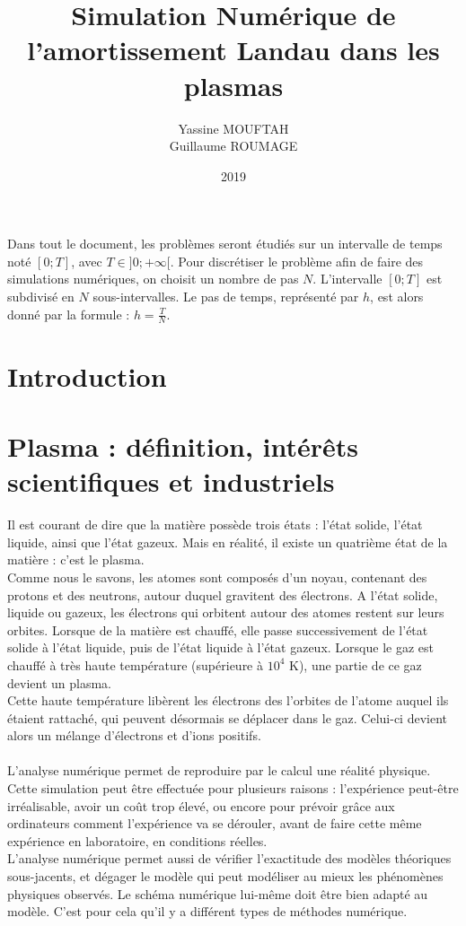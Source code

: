 \documentclass{article}
\title{Simulation Numérique de l'amortissement Landau dans les plasmas}
\date{2019}
\author{Yassine MOUFTAH\\Guillaume ROUMAGE}
\begin{document}
\maketitle
\newpage
\noindent Dans tout le document, les problèmes seront étudiés sur un intervalle de temps noté $[0;T]$, avec $T \in ]0; + \infty[$. Pour discrétiser le problème afin de faire des simulations numériques, on choisit un nombre de pas $N$. L'intervalle $[0;T]$ est subdivisé en $N$ sous-intervalles. Le pas de temps, représenté par $h$, est alors donné par la formule : $h = \frac{T}{N}$.
\newpage
\section{Introduction}
\section{Plasma : définition, intérêts scientifiques et industriels}
Il est courant de dire que la matière possède trois états : l'état solide, l'état liquide, ainsi que l'état gazeux. Mais en réalité, il existe un quatrième état de la matière : c'est le plasma.\\
Comme nous le savons, les atomes sont composés d'un noyau, contenant des protons et des neutrons, autour duquel gravitent des électrons. A l'état solide, liquide ou gazeux, les électrons qui orbitent autour des atomes restent sur leurs orbites. Lorsque de la matière est chauffé, elle passe successivement de l'état solide à l'état liquide, puis de l'état liquide à l'état gazeux. Lorsque le gaz est chauffé à très haute température (supérieure à $10^4$ K), une partie de ce gaz devient un plasma.\\
Cette haute température libèrent les électrons des l'orbites de l'atome auquel ils étaient rattaché, qui peuvent désormais se déplacer dans le gaz. Celui-ci devient alors un mélange d'électrons et d'ions positifs.\\
\\
L'analyse numérique permet de reproduire par le calcul une réalité physique. Cette simulation peut être effectuée pour plusieurs raisons : l'expérience peut-être irréalisable, avoir un coût trop élevé, ou encore pour prévoir grâce aux ordinateurs comment l'expérience va se dérouler, avant de faire cette même expérience en laboratoire, en conditions réelles.\\
L'analyse numérique permet aussi de vérifier l'exactitude des modèles théoriques sous-jacents, et dégager le modèle qui peut modéliser au mieux les phénomènes physiques observés. Le schéma numérique lui-même doit être bien adapté au modèle. C'est pour cela qu'il y a différent types de méthodes numérique.
\end{document}
